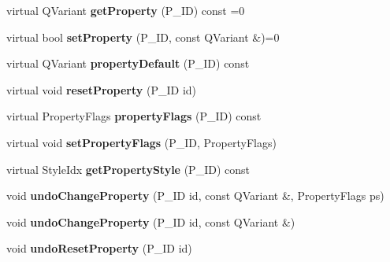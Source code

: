 \begin{DoxyCompactItemize}
virtual Q\+Variant {\bfseries get\+Property} (P\+\_\+\+ID) const =0
\item 
\mbox{\label{class_ms_1_1_score_element_a3e73dcc73230ac5456b4ed35a5a46725}} 
virtual bool {\bfseries set\+Property} (P\+\_\+\+ID, const Q\+Variant \&)=0
\item 
\mbox{\label{class_ms_1_1_score_element_a2751e3ad597d76d0ee8107d8515285ed}} 
virtual Q\+Variant {\bfseries property\+Default} (P\+\_\+\+ID) const
\item 
\mbox{\label{class_ms_1_1_score_element_ae84a49e39a49427d4b859e0f2eac0a0c}} 
virtual void {\bfseries reset\+Property} (P\+\_\+\+ID id)
\item 
\mbox{\label{class_ms_1_1_score_element_a1ccb82c8170c0b8ca5748879bffc44e6}} 
virtual Property\+Flags {\bfseries property\+Flags} (P\+\_\+\+ID) const
\item 
\mbox{\label{class_ms_1_1_score_element_a8ad551ed64d5ee466ff0b4d5992ae252}} 
virtual void {\bfseries set\+Property\+Flags} (P\+\_\+\+ID, Property\+Flags)
\item 
\mbox{\label{class_ms_1_1_score_element_ac70559cf9efa9e503dcafd3a6d82c7a0}} 
virtual Style\+Idx {\bfseries get\+Property\+Style} (P\+\_\+\+ID) const
\item 
\mbox{\label{class_ms_1_1_score_element_aba58b3b45f4717c238275d98509f43b7}} 
void {\bfseries undo\+Change\+Property} (P\+\_\+\+ID id, const Q\+Variant \&, Property\+Flags ps)
\item 
\mbox{\label{class_ms_1_1_score_element_a8c946c701ba5d45b118fa2825306adb4}} 
void {\bfseries undo\+Change\+Property} (P\+\_\+\+ID id, const Q\+Variant \&)
\item 
\mbox{\label{class_ms_1_1_score_element_ab17bd165ec90885c9912738fd98b8f9a}} 
void {\bfseries undo\+Reset\+Property} (P\+\_\+\+ID id)
\item 
\mbox{\label{class_ms_1_1_score_element_a5a2cfd46a97161523212d204e3ff2948}} 

\end{DoxyCompactItemize}
